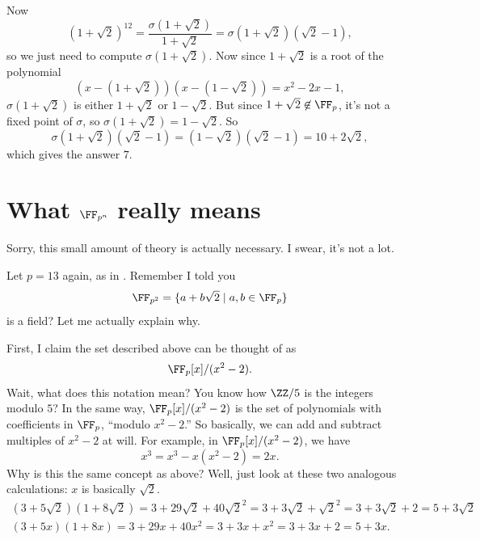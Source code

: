 \documentclass[11pt]{scrartcl}
\begin{document}
\begin{solution}{}
    Now
    \[(1 + \sqrt2)^{12} = \frac{\sigma(1 + \sqrt2)}{1 + \sqrt2} = \sigma(1 + \sqrt2)(\sqrt2 - 1),\]
    so we just need to compute $\sigma(1 + \sqrt2)$. Now since $1 + \sqrt2$ is a root of the polynomial
    \[(x - (1 + \sqrt2))(x - (1 - \sqrt2)) = x^2 - 2x - 1,\]
    $\sigma(1 + \sqrt2)$ is either $1 + \sqrt2$ or $1 - \sqrt2$. But since $1 + \sqrt2 \not\in \FF_p$, it's not a fixed point of $\sigma$, so $\sigma(1 + \sqrt2) = 1 - \sqrt2$. So
    \[\sigma(1 + \sqrt2)(\sqrt2 - 1) = (1 - \sqrt2)(\sqrt2 - 1) = 10 + 2\sqrt2,\]
    which gives the answer $7$.
\end{solution}

\section{What \texorpdfstring{$\FF_{p^n}$}{} really means}

Sorry, this small amount of theory is actually necessary. I swear, it's not a lot.

Let $p = 13$ again, as in . Remember I told you
\[\FF_{p^2} = \{a + b\sqrt2 \mid a,b \in \FF_p\}\]
is a field? Let me actually explain why.

First, I claim the set described above can be thought of as
\[\FF_p[x]/(x^2 - 2).\]
Wait, what does this notation mean? You know how $\ZZ/5$ is the integers modulo $5$? In the same way, $\FF_p[x]/(x^2 - 2)$ is the set of polynomials with coefficients in $\FF_p$, ``modulo $x^2 - 2$.'' So basically, we can add and subtract multiples of $x^2 - 2$ at will. For example, in $\FF_p[x]/(x^2 - 2)$, we have
\[x^3 = x^3 - x(x^2 - 2) = 2x.\]
Why is this the same concept as above? Well, just look at these two analogous calculations: $x$ is basically $\sqrt2$.
\begin{multline*}
    (3 + 5\sqrt2)(1 + 8\sqrt2) = 3 + 29\sqrt2 + 40\sqrt2^2 = 3 + 3\sqrt2 + \sqrt2^2 = 3 + 3\sqrt2 + 2 = 5 + 3\sqrt2 \\
    (3 + 5x)(1 + 8x) = 3 + 29x + 40x^2 = 3 + 3x + x^2 = 3 + 3x + 2 = 5 + 3x.
\end{multline*}
\end{document}
